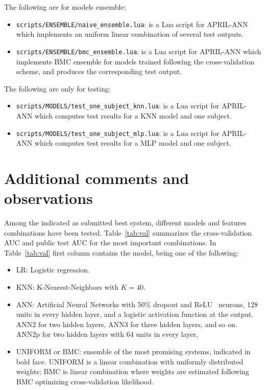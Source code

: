 \documentclass[a4paper,english,twoside]{article}
\begin{document}
The following are for models ensemble:

\begin{itemize}
\item \verb+scripts/ENSEMBLE/naive_ensemble.lua+: is a Lua script for
  APRIL-ANN which implements an uniform linear combination of several test
  outputs.
\item \verb+scripts/ENSEMBLE/bmc_ensemble.lua+: is a Lua script for APRIL-ANN
  which implements BMC ensemble for models trained following the
  cross-validation scheme, and produces the corresponding test output.
\end{itemize}

The following are only for testing:

\begin{itemize}
\item \verb+scripts/MODELS/test_one_subject_knn.lua+: is a Lua script for
  APRIL-ANN which computes test results for a KNN model and one subject.
\item \verb+scripts/MODELS/test_one_subject_mlp.lua+: is a Lua script for
  APRIL-ANN which computes test results for a MLP model and one subject.
\end{itemize}

\section{Additional comments and
  observations}\label{additional-comments-and-observations}

Among the indicated as submitted best system, different models and
features combinations have been tested. Table~\ref{tab:val} summarizes
the cross-validation AUC and public test AUC for the most important
combinations. In Table~\ref{tab:val} first column contains the model, being one
of the following:

\begin{itemize}
\item
  LR: Logistic regression.
\item
  KNN: K-Nearest-Neighbors with $K=40$.
\item ANN: Artificial Neural Networks with 50\% dropout and
  ReLU~\cite{2011:glorot:aistats} neurons, 128 units in every hidden layer, and
  a logistic activation function at the output.  ANN2 for two hidden layers,
  ANN3 for three hidden layers, and so on. ANN2p for two hidden layers with 64
  units in every layer,
\item
  UNIFORM or BMC: ensemble of the most promising systems, indicated in
  bold face. UNIFORM is a linear combination with uniformly distributed
  weights; BMC is linear combination where weights are estimated
  following BMC optimizing cross-validation likelihood.
\end{itemize}
\end{document}

